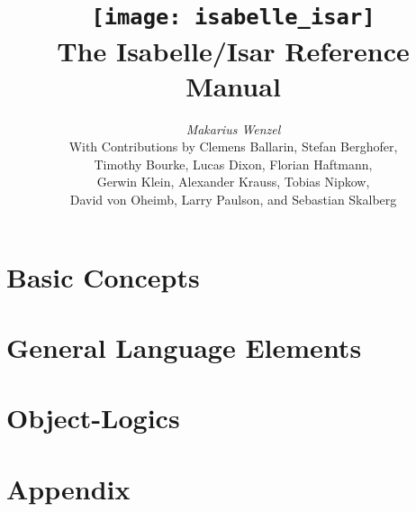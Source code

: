 \documentclass[12pt,a4paper,fleqn]{report}
\title{\texttt{[image: isabelle\_isar]} \\[4ex] The Isabelle/Isar Reference Manual}
\author{\emph{Makarius Wenzel} \\[3ex]
  With Contributions by
  Clemens Ballarin,
  Stefan Berghofer, \\
  Timothy Bourke,
  Lucas Dixon,
  Florian Haftmann, \\
  Gerwin Klein,
  Alexander Krauss,
  Tobias Nipkow, \\
  David von Oheimb,
  Larry Paulson,
  and Sebastian Skalberg
}
\let\intorig=\int  %
\begin{document}
\maketitle 

 \tableofcontents \clearfirst

\part{Basic Concepts}



\part{General Language Elements}







\part{Object-Logics}




\part{Appendix}
\appendix

\let\int\intorig



\begingroup
   \small\raggedright\frenchspacing
  
\endgroup

\printindex
\end{document}
